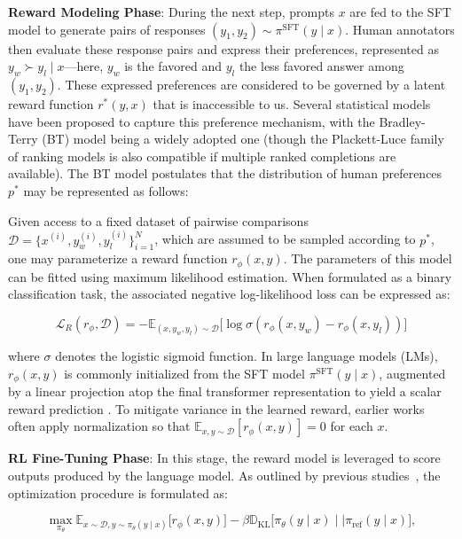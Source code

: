 \textbf{Reward Modeling Phase}: During the next step, prompts $x$ are fed to the SFT model to generate pairs of responses $(y_1, y_2)\sim \pi^\text{SFT}(y \mid x)$. Human annotators then evaluate these response pairs and express their preferences, represented as $y_w\succ y_l \mid x$—here, $y_w$ is the favored and $y_l$ the less favored answer among $(y_1, y_2)$. These expressed preferences are considered to be governed by a latent reward function $r^*(y, x)$ that is inaccessible to us. Several statistical models have been proposed to capture this preference mechanism, with the Bradley-Terry (BT) model \cite{bradley1952rankanalysis} being a widely adopted one (though the Plackett-Luce family of ranking models \citep{plackett1975analysis, luce2012individual} is also compatible if multiple ranked completions are available). The BT model postulates that the distribution of human preferences $p^*$ may be represented as follows:

Given access to a fixed dataset of pairwise comparisons $\mathcal{D}=\bigl\{x^{(i)}, y_w^{(i)}, y_l^{(i)}\bigr\}_{i=1}^N$, which are assumed to be sampled according to $p^*$, one may parameterize a reward function $r_{\phi}(x, y)$. The parameters of this model can be fitted using maximum likelihood estimation. When formulated as a binary classification task, the associated negative log-likelihood loss can be expressed as:

\begin{equation}\label{eq:reward_model}
    \mathcal{L}_R(r_{\phi}, \mathcal{D}) = -\mathbb{E}_{(x, y_w, y_l)\sim \mathcal{D}}\bigl[\log \sigma(r_{\phi}(x, y_w)- r_{\phi}(x, y_l))\bigr]
\end{equation}

where $\sigma$ denotes the logistic sigmoid function. In large language models (LMs), $r_{\phi}(x, y)$ is commonly initialized from the SFT model $\pi^\text{SFT}(y \mid x)$, augmented by a linear projection atop the final transformer representation to yield a scalar reward prediction \cite{ziegler2020finetuning}. To mitigate variance in the learned reward, earlier works often apply normalization so that  $\mathbb{E}_{x,y\sim \mathcal{D}}\left[r_\phi(x, y)\right] = 0$ for each $x$.

\textbf{RL Fine-Tuning Phase}: In this stage, the reward model is leveraged to score outputs produced by the language model. As outlined by previous studies~\citep{jaques2017sequence, jaques2020human}, the optimization procedure is formulated as:

\begin{equation}\label{eq:RL}
\max_{\pi_{\theta}}  \mathbb{E}_{x\sim \mathcal{D}, y\sim \pi_{\theta}(y \mid x)}\bigl[r_{\phi}(x, y)\bigr] - \beta\mathbb{D}_{\textrm{KL}}\bigl[\pi_{\theta}(y\mid x)\mid \mid \pi_\text{ref}(y\mid x)\bigr],
\end{equation}

